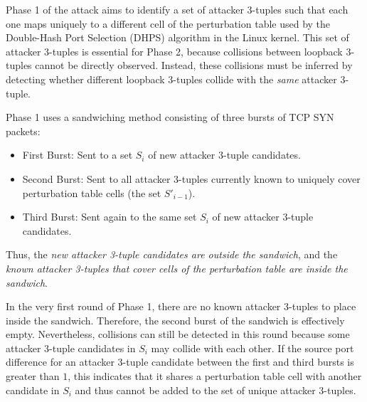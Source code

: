 \documentclass{report}
\begin{document}
Phase 1 of the attack aims to identify a set of attacker 3-tuples such that each one maps uniquely to a different cell of the perturbation table used by the Double-Hash Port Selection (DHPS) algorithm in the Linux kernel. This set of attacker 3-tuples is essential for Phase 2, because collisions between loopback 3-tuples cannot be directly observed. Instead, these collisions must be inferred by detecting whether different loopback 3-tuples collide with the \emph{same} attacker 3-tuple.


Phase 1 uses a \alert{sandwiching method} consisting of three bursts of TCP SYN packets:

\begin{itemize}
	\item \alert{First Burst:} Sent to a set $S_i$ of new attacker 3-tuple candidates.
	\item \alert{Second Burst:} Sent to all attacker 3-tuples currently known to uniquely cover perturbation table cells (the set $S'_{i-1}$).
	\item \alert{Third Burst:} Sent again to the same set $S_i$ of new attacker 3-tuple candidates.
\end{itemize}

Thus, the \emph{new attacker 3-tuple candidates are outside the sandwich}, and the \emph{known attacker 3-tuples that cover cells of the perturbation table are inside the sandwich}.


In the very first round of Phase 1, there are no known attacker 3-tuples to place inside the sandwich. Therefore, the second burst of the sandwich is effectively empty. Nevertheless, collisions can still be detected in this round because some attacker 3-tuple candidates in $S_i$ may collide with each other. If the source port difference for an attacker 3-tuple candidate between the first and third bursts is greater than $1$, this indicates that it shares a perturbation table cell with another candidate in $S_i$ and thus cannot be added to the set of unique attacker 3-tuples.

\end{document}

